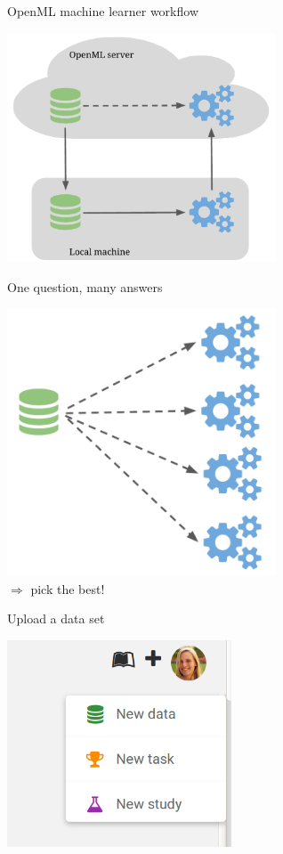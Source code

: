 \documentclass{beamer}
\begin{document}
\begin{frame}[fragile]{OpenML machine learner workflow}
\begin{center}
\includegraphics[width = 0.6\textwidth]{wf}
\end{center}
\end{frame}

\begin{frame}[fragile]{One question, many answers}
\begin{center}
\includegraphics[width = 0.6\textwidth]{wf_ds}\\[2em]
\large $\Rightarrow$ pick the best!
\end{center}
\end{frame}


\begin{frame}[fragile]{Upload a data set}
\begin{center}
\includegraphics[width = 0.5\textwidth]{add}
\end{center}
\end{frame}
\end{document}
